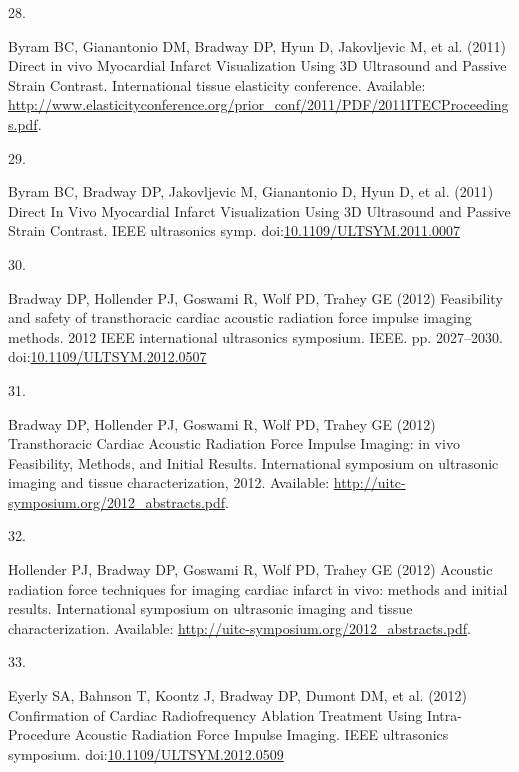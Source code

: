 \documentclass[
]{article}
\newlength{\cslhangindent}
\newlength{\csllabelwidth}
\newlength{\cslentryspacingunit} %
\newenvironment{CSLReferences}[2] %
 {%
  \setlength{\parindent}{0pt}
  \ifodd #1
  \let\oldpar\par
  \def\par{\hangindent=\cslhangindent\oldpar}
  \fi
  \setlength{\parskip}{#2\cslentryspacingunit}
 }%
 {}
\newcommand{\CSLLeftMargin}[1]{\parbox[t]{\csllabelwidth}{#1}}
\newcommand{\CSLRightInline}[1]{\parbox[t]{\linewidth - \csllabelwidth}{#1}\break}
\begin{document}
\begin{CSLReferences}{0}{0}
\leavevmode{}%
\CSLLeftMargin{28. }
\CSLRightInline{Byram BC, Gianantonio DM, Bradway DP, Hyun D,
Jakovljevic M, et al. (2011) {Direct in vivo Myocardial Infarct
Visualization Using 3D Ultrasound and Passive Strain Contrast}.
International tissue elasticity conference. Available:
\url{http://www.elasticityconference.org/prior_conf/2011/PDF/2011ITECProceedings.pdf}.}

\leavevmode{}%
\CSLLeftMargin{29. }
\CSLRightInline{Byram BC, Bradway DP, Jakovljevic M, Gianantonio D, Hyun
D, et al. (2011) {Direct In Vivo Myocardial Infarct Visualization Using
3D Ultrasound and Passive Strain Contrast}. IEEE ultrasonics symp.
doi:\href{https://doi.org/10.1109/ULTSYM.2011.0007}{10.1109/ULTSYM.2011.0007}}

\leavevmode{}%
\CSLLeftMargin{30. }
\CSLRightInline{Bradway DP, Hollender PJ, Goswami R, Wolf PD, Trahey GE
(2012) Feasibility and safety of transthoracic cardiac acoustic
radiation force impulse imaging methods. 2012 IEEE international
ultrasonics symposium. IEEE. pp. 2027--2030.
doi:\href{https://doi.org/10.1109/ULTSYM.2012.0507}{10.1109/ULTSYM.2012.0507}}

\leavevmode{}%
\CSLLeftMargin{31. }
\CSLRightInline{Bradway DP, Hollender PJ, Goswami R, Wolf PD, Trahey GE
(2012) {Transthoracic Cardiac Acoustic Radiation Force Impulse Imaging:
in vivo Feasibility, Methods, and Initial Results}. International
symposium on ultrasonic imaging and tissue characterization, 2012.
Available: \url{http://uitc-symposium.org/2012_abstracts.pdf}.}

\leavevmode{}%
\CSLLeftMargin{32. }
\CSLRightInline{Hollender PJ, Bradway DP, Goswami R, Wolf PD, Trahey GE
(2012) {Acoustic radiation force techniques for imaging cardiac infarct
in vivo: methods and initial results}. International symposium on
ultrasonic imaging and tissue characterization. Available:
\url{http://uitc-symposium.org/2012_abstracts.pdf}.}

\leavevmode{}%
\CSLLeftMargin{33. }
\CSLRightInline{Eyerly SA, Bahnson T, Koontz J, Bradway DP, Dumont DM,
et al. (2012) {Confirmation of Cardiac Radiofrequency Ablation Treatment
Using Intra-Procedure Acoustic Radiation Force Impulse Imaging}. IEEE
ultrasonics symposium.
doi:\href{https://doi.org/10.1109/ULTSYM.2012.0509}{10.1109/ULTSYM.2012.0509}}


\end{CSLReferences}
\end{document}
